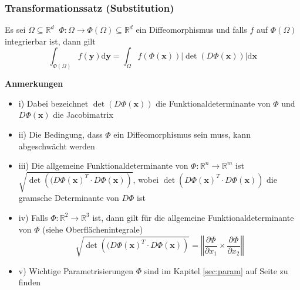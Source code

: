 \documentclass[8pt, a4paper, landscape, fleqn]{scrartcl}
\newenvironment {annotation}[1]
				{\begin{itshape} \begin{small} \textbf{#1} \begin{itemize}}
				{\end{itemize} \end{small} \end{itshape}}
\begin{document}
\begin{multicols*}{3}
				\subsubsection{Transformationssatz (Substitution)}
					\label{sec:transformationssatz}
					Es sei $\Omega \subseteq \mathbb{R}^d \hspace{7pt} \Phi: \Omega \rightarrow \Phi(\Omega) \subseteq \mathbb{R}^d$ ein Diffeomorphismus und falls $f$ auf $\Phi(\Omega)$ integrierbar ist, dann gilt
					\begin{equation*}
						\int_{\Phi(\Omega)}f(\textbf{y})\text{d}\textbf{y}=\int_{\Omega}f(\Phi(\textbf{x}))\vert \det(D\Phi(\textbf{x}))\vert \text{d}\textbf{x}
					\end{equation*}
					\begin{annotation}{Anmerkungen}
						\item[i)] Dabei bezeichnet $\det(D\Phi(\textbf{x}))$ die Funktionaldeterminante von $\Phi$ und $D\Phi(\textbf{x})$ die Jacobimatrix
						\item [ii)] Die Bedingung, dass $\Phi$ ein Diffeomorphismus sein muss, kann abgeschwächt werden
						\item [iii)] Die allgemeine Funktionaldeterminante von $\Phi: \mathbb{R}^n \rightarrow \mathbb{R}^m$ ist $\sqrt{\det \left((D\Phi(\textbf{x})^T\cdot D\Phi(\textbf{x})\right)}$, wobei $\det \left(D\Phi(\textbf{x})^T\cdot D\Phi(\textbf{x})\right)$ die gramsche Determinante  von $D\Phi$ ist
						\item[iv)] Falls $\Phi: \mathbb{R}^2 \rightarrow \mathbb{R}^3$ ist, dann gilt für die allgemeine Funktionaldeterminante von  $\Phi$ (siehe Oberflächenintegrale)
						\begin{equation*}
							\sqrt{\det \left((D\Phi(\textbf{x})^T\cdot D\Phi(\textbf{x})\right)}=\left \Vert \frac{\partial \Phi}{\partial x_1} \times \frac{\partial \Phi}{\partial x_2} \right \Vert
						\end{equation*}
						\item[v)] Wichtige Parametrisierungen $\Phi$ sind im Kapitel \ref{sec:param} auf Seite \pageref{sec:param} zu finden
					\end{annotation}

\end{multicols*}
\end{document}
